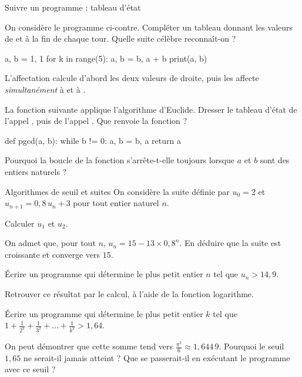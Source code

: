 \begin{exercice}[2]{Suivre un programme : tableau d'état}
\begin{questions}
  \item On considère le programme ci-contre. Compléter un tableau donnant les valeurs de  et  à la fin de chaque tour.
    Quelle suite célèbre reconnaît-on ?
\begin{codecote}[0.42]
\begin{pythoncol}
a, b = 1, 1
for k in range(5):
    a, b = b, a + b
print(a, b)
\end{pythoncol}
\cote
L'affectation  calcule d'abord les deux valeurs de droite, puis les affecte \emph{simultanément} à
 et à .
\end{codecote}
  \item La fonction suivante applique l'algorithme d'Euclide. Dresser le tableau d'état de l'appel , puis de
    l'appel . Que renvoie la fonction ?
\begin{python}
def pgcd(a, b):
    while b != 0:
        a, b = b, a %
    return a
\end{python}
  \item Pourquoi la boucle de la fonction  s'arrête-t-elle toujours lorsque $a$ et $b$ sont des entiers naturels ?
\end{questions}
\end{exercice}


\begin{exercice}[2]{Algorithmes de seuil et suites}
On considère la suite définie par $u_0=2$ et $u_{n+1}=0{,}8\,u_n+3$ pour tout entier naturel $n$.
\begin{questions}
  \item Calculer $u_1$ et $u_2$.
  \item On admet que, pour tout $n$, $u_n=15-13\times0{,}8^{n}$. En déduire que la suite est croissante et converge vers $15$.
  \item Écrire un programme qui détermine le plus petit entier $n$ tel que $u_n>14{,}9$.
  \item Retrouver ce résultat par le calcul, à l'aide de la fonction logarithme.
\end{questions}
\begin{questions}[resume]
  \item Écrire un programme qui détermine le plus petit entier $k$ tel que $1+\frac1{2^{2}}+\frac1{3^{2}}+\dots+\frac1{k^{2}}>1{,}64$.
  \item On peut démontrer que cette somme tend vers $\frac{\pi^{2}}{6}\approx1{,}644\,9$. Pourquoi le seuil $1{,}65$ ne serait-il jamais
    atteint ? Que se passerait-il en exécutant le programme avec ce seuil ?
\end{questions}
\end{exercice}

